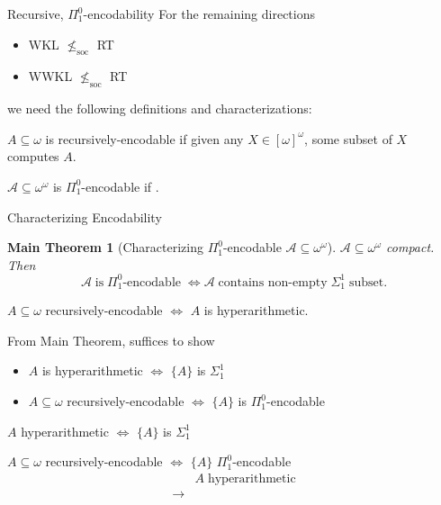 \begin{frame}{Recursive, $\Pi_1^0$-encodability}
  For the remaining directions
  \begin{itemize}
    \item WKL $\nleq_{\text{soc}}$ RT
    \item WWKL $\nleq_{\text{soc}}$ RT
  \end{itemize}

  we need the following definitions and characterizations:
  \vspace{1em}

  \begin{define}
    $A\subseteq\omega$ is recursively-encodable if given any
    $X\in[\omega]^\omega$, some subset of $X$ computes $A$.
  \end{define}

  \begin{define}[$\Pi_1^0$-encodability]
    $\mathcal{A}\subseteq \omega^{\omega}$ is $\Pi_1^0$-encodable if
    .
  \end{define}
\end{frame}

\begin{frame}{Characterizing Encodability}
  \newtheorem*{main-thm*}{Main Theorem}
  \begin{main-thm*}[Characterizing $\Pi_1^0$-encodable
  $\mathcal{A}\subseteq\omega^\omega$]
    $\mathcal{A}\subseteq \omega^{\omega}$ compact. Then
    \[\mathcal{A}\; \text{is}\; \Pi_1^0\text{-encodable}\; \Leftrightarrow
    \mathcal{A}\; \text{contains non-empty}\; \Sigma_1^1\; \text{subset}.\]
  \end{main-thm*}

  \begin{coro*}
    $A\subseteq\omega$ recursively-encodable $\Leftrightarrow$ $A$ is
    hyperarithmetic.
  \end{coro*}

  \vspace{1em}
  From Main Theorem, suffices to show
  \begin{itemize}
    \item $A$ is hyperarithmetic $\Leftrightarrow$ $\{A\}$ is $\Sigma_1^1$
    \item $A\subseteq\omega$ recursively-encodable $\Leftrightarrow$
      $\{A\}$ is $\Pi_1^0$-encodable
  \end{itemize}
\end{frame}

\begin{frame}{$A$ hyperarithmetic $\Leftrightarrow$ $\{A\}$ is $\Sigma_1^1$}
\end{frame}

\begin{frame}{$A\subseteq\omega$ recursively-encodable $\Leftrightarrow$
$\{A\}$ $\Pi_1^0$-encodable}
  \begin{align*}
    &A\; \text{hyperarithmetic}\\
    \rightarrow &\\
  \end{align*}
\end{frame}
